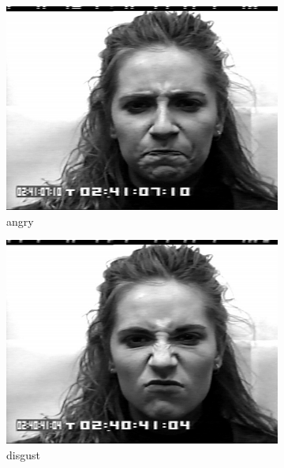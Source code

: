 \begin{figure}
\begin{subfigure}[b]{0.22\textwidth}
		\includegraphics[width=\textwidth]{./img/dataset/angry.png}
		\caption{angry}
		\label{fig:dataset:angry}
	\end{subfigure}
	\begin{subfigure}[b]{0.22\textwidth}
		\includegraphics[width=\textwidth]{./img/dataset/disgust.png}
		\caption{disgust}
		\label{fig:dataset:disgust}
	\end{subfigure}
	\begin{subfigure}[b]{0.22\textwidth}

\end{subfigure}
\end{figure}
